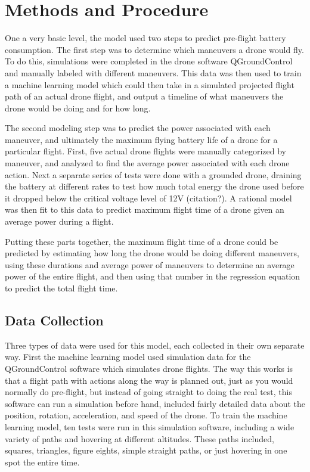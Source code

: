 \documentclass{article}
\begin{document}
\section{Methods and Procedure}

One a very basic level, the model used two steps to predict pre-flight battery consumption. The first step was to determine which maneuvers a drone would fly. To do this, simulations were completed in the drone software QGroundControl and manually labeled with different maneuvers. This data was then used to train a machine learning model which could then take in a simulated projected flight path of an actual drone flight, and output a timeline of what maneuvers the drone would be doing and for how long.\par

The second modeling step was to predict the power associated with each maneuver, and ultimately the maximum flying battery life of a drone for a particular flight. First, five actual drone flights were manually categorized by maneuver, and analyzed to find the average power associated with each drone action. Next a separate series of tests were done with a grounded drone, draining the battery at different rates to test how much total energy the drone used before it dropped below the critical voltage level of 12V (citation?). A rational model was then fit to this data to predict maximum flight time of a drone given an average power during a flight.\par

Putting these parts together, the maximum flight time of a drone could be predicted by estimating how long the drone would be doing different maneuvers, using these durations and average power of maneuvers to determine an average power of the entire flight, and then using that number in the regression equation to predict the total flight time.


\subsection{Data Collection}
Three types of data were used for this model, each collected in their own separate way. First the machine learning model used simulation data for the QGroundControl software which simulates drone flights. The way this works is that a flight path with actions along the way is planned out, just as you would normally do pre-flight, but instead of going straight to doing the real test, this software can run a simulation before hand, included fairly detailed data about the position, rotation, acceleration, and speed of the drone. To train the machine learning model, ten tests were run in this simulation software, including a wide variety of paths and hovering at different altitudes. These paths included, squares, triangles, figure eights, simple straight paths, or just hovering in one spot the entire time. \par
\end{document}
